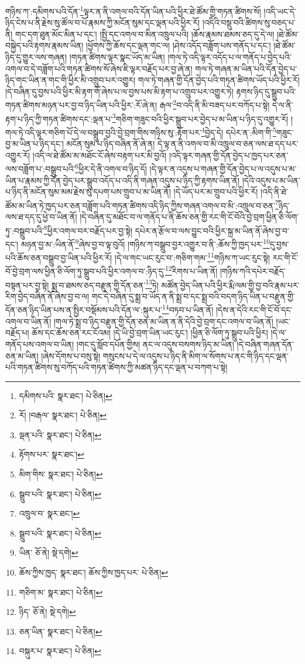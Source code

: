གཉིས་ཀ་:དམིགས་པའི་དོན་\footnote{དམིགས་པའི་  སྣར་ཐང་།  པེ་ཅིན། }ལྟར་ན་ནི་འགལ་བའི་དོན་ཡིན་པའི་ཕྱིར་ཐེ་ཚོམ་གྱི་གཏན་ཚིགས་སོ། །འདི་ཡང་དེ་ཉིད་ངེས་པ་ནི་རྗེས་སུ་ཚོལ་བ་པོ་རྣམས་ཀྱི་མངོན་སུམ་དང་ལྡན་པའི་ཕྱིར་རོ། །འདིའི་བསྡུ་བའི་ཚིགས་སུ་བཅད་པ་ནི། གང་དག་ཐུན་མོང་མིན་པ་དང་། །སྤྱི་དང་འགལ་བ་མིན་འཁྲུལ་པའི། །ཆོས་རྣམས་ཐམས་ཅད་དུ་དེ་ལ། །ཐེ་ཚོམ་བསྐྱེད་པའི་རྟགས་རྣམས་ཡིན། །ཕྱོགས་ཀྱི་ཆོས་དང་ལྡན་གང་ལ། །ཤེས་འདོད་བཟློག་པས་གནོད་པ་དང་། །ཐེ་ཚོམ་ཉིད་དུ་གྱུར་ལས་གཞན། །གཏན་ཚིགས་ལྟར་སྣང་ཡོད་མ་ཡིན། །གལ་ཏེ་འདི་ལྟར་འདོད་པ་ལ་གནོད་པ་བྱེད་པའི་འགལ་བ་དེ་བཟློག་པའི་གཏན་ཚིགས་སོ་ཞེས་ཇི་ལྟར་བརྗོད་པར་བྱ་ཞེ་ན། གལ་ཏེ་གཞན་མ་ཡིན་པའི་དོན་བྱེད་པ་ཉིད་གང་ཡིན་ན་གང་གི་ཕྱིར་མི་འགྲུབ་པར་འགྱུར། གལ་ཏེ་གཞན་གྱི་དོན་བྱེད་པའི་གཏན་ཚིགས་ཡོད་པའི་ཕྱིར་རོ། །དེ་བཞིན་དུ་བྱས་པའི་ཕྱིར་མི་རྟག་གོ་ཞེས་པ་ལ་བྱས་པས་མི་རྟག་པ་འགྲུབ་པར་འགྱུར་ཏེ། རྟགས་ཉིད་དུ་སྒྲུབ་པའི་གཏན་ཚིགས་མཉན་པར་བྱ་བ་ཉིད་ཡིན་པའི་ཕྱིར་:རོ་ཞེ་ན། རྒལ་\footnote{རོ། །བརྒལ་  སྣར་ཐང་།  པེ་ཅིན། }བ་འདི་ནི་མི་བཟད་པར་བཀོད་པ་སྟེ། དེ་ལ་ནི་རྟག་པ་ཉིད་ཀྱི་གཏན་ཚིགས་དང་:ལྡན་པ་\footnote{ལྡན་པའི་  སྣར་ཐང་།  པེ་ཅིན། }གཅིག་གཟུང་བའི་ཕྱིར་སྒྲུབ་པར་བྱེད་པ་མ་ཡིན་པ་ཉིད་དུ་འགྱུར་རོ། །གལ་ཏེ་འདི་ལྟར་གཅིག་པོ་དེ་ལ་བསྒྲུབ་བྱའི་བྱེ་བྲག་གིས་གཉིས་སུ་:རྟོག་པར་\footnote{རྟོགས་པར་  སྣར་ཐང་། }བྱེད་དེ། དཔེར་ན་:མིག་གི་\footnote{མིག་གིས་  སྣར་ཐང་།  པེ་ཅིན། }གཟུང་བྱ་མ་ཡིན་པ་ཉིད་དང་། མངོན་སུམ་པ་ཉིད་བཞིན་ནོ་ཞེ་ན། དེ་ལྟ་ན་ནི་འགལ་བ་མི་འཁྲུལ་བ་ཅན་ལས་ཐ་དད་པར་འགྱུར་རོ། །འདི་ལ་ཐེ་ཚོམ་མ་མཐོང་ངོ་ཞེས་བརྟག་པར་མི་བྱའོ། །འདི་ལྟར་གཞན་གྱི་དོན་བྱེད་པ་ཁྱད་པར་ཅན་ལས་བཟློག་པ་:བསྒྲུབ་པའི་\footnote{སྒྲུབ་པའི་  སྣར་ཐང་།  པེ་ཅིན། }ཕྱིར་དེ་ནི་འགལ་བ་ཉིད་དོ། །དེ་ལྟར་ན་འདུས་པ་གཞན་གྱི་དོན་བྱེད་པ་ལ་འདུས་པ་མ་ཡིན་པ་རྣམས་ཀྱི་དོན་བྱེད་པར་སྒྲུབ་འདོད་པ་འདི་ནི་གཞན་འདུས་པ་ཉིད་ཀྱི་རྟགས་ཡིན་ནོ། །དེའི་འདུས་པ་མ་ཡིན་པ་ཉིད་ནི་མངོན་སུམ་མམ་རྗེས་སུ་དཔག་པས་གྲུབ་པ་མ་ཡིན་ནོ། །དེ་ཡོད་པར་མ་གྲུབ་པའི་ཕྱིར་རོ། །འདི་ནི་ཐེ་ཚོམ་མ་ཡིན་ཏེ་ཁྱད་པར་ཅན་བཟློག་པའི་གཏན་ཚིགས་འདི་ཉིད་ཀྱིས་གཞན་འགལ་བ་མི་:འཁྲུལ་བ་ཅན་\footnote{འཁྲུལ་བ་  སྣར་ཐང་། }ཉིད་ལས་ཐ་དད་དུ་ཕྱེ་བ་ཡིན་ནོ། །དེ་བཞིན་དུ་མཐོང་བ་ལ་གནོད་པ་ནི་ཆོས་ཅན་གྱི་རང་གི་ངོ་བོའི་བྱེ་བྲག་ཕྱིན་ཅི་ལོག་ཏུ་:བསྒྲུབ་པའི་\footnote{སྒྲུབ་པའི་  སྣར་ཐང་།  པེ་ཅིན། }ཕྱིར་འགལ་བར་བརྗོད་པར་བྱ་སྟེ། དཔེར་ན་རྩོལ་བ་ལས་བྱུང་བའི་ཕྱིར་སྐྲ་མ་ཡིན་ནོ་ཞེས་བྱ་བ་དང་། མཉན་བྱ་མ་:ཡིན་ནོ་\footnote{ཡིན་  ཅོ་ནེ།  སྡེ་དགེ། }ཞེས་བྱ་བ་ལྟ་བུའོ། །གཉིས་ཀ་བསྒྲུབ་བྱར་འགྱུར་བ་ནི་:ཆོས་ཀྱི་ཁྱད་པར་\footnote{ཆོས་ཀྱིས་ཁྱད་  སྣར་ཐང་། ཆོས་ཀྱིས་ཁྱད་པར་  པེ་ཅིན། }དུ་བྱས་པའི་ཆོས་ཅན་བསྒྲུབ་བྱ་ཡིན་པའི་ཕྱིར་རོ། །དེ་ལ་གང་ཡང་རུང་བ་:གཅིག་གམ་\footnote{གཅིག་མ་  སྣར་ཐང་།  པེ་ཅིན། }གཉིས་ཀ་ཡང་རུང་སྟེ། རང་གི་ངོ་བོ་བྱེ་བྲག་ལས་ཕྱིན་ཅི་ལོག་ཏུ་སྒྲུབ་པའི་ཕྱིར་འགལ་བ་:ཉིད་དུ་\footnote{ཉིད་  ཅོ་ནེ།  སྡེ་དགེ། }རིགས་པ་ཡིན་ནོ། །གཉིས་ཀའི་དཔེར་བརྗོད་བསྟན་པར་བྱ་སྟེ། སྨྲ་བ་ཐམས་ཅད་བརྫུན་གྱི་དོན་ཅན་\footnote{ཅན་ཡིན་  སྣར་ཐང་།  པེ་ཅིན། }ཏེ། མཚོན་བྱེད་ཡིན་པའི་ཕྱིར་རྨི་ལམ་གྱི་བྱ་བའི་རྣམ་པར་རིག་བྱེད་བཞིན་ནོ་ཞེས་བྱ་བ་ལ། གང་དེ་བཞིན་དུ་སྨྲ་བ་ཡོད་ན་ནི་སྨྲ་བ་དང་སྨྲ་བའི་བདག་ཉིད་ཡིན་པ་བརྫུན་གྱི་དོན་ཅན་ཉིད་ཡིན་པས་ན་སྤྱིར་བསྡོམས་པའི་དོན་ལ་:སྐུར་པ་\footnote{བསྐུར་པ་  སྣར་ཐང་།  པེ་ཅིན། }བཏབ་པ་ཡིན་ནོ། །དེས་ན་དེའི་རང་གི་ངོ་བོ་དང་འགལ་བ་ཡིན་ནོ། །གལ་ཏེ་སྨྲ་བ་ཉིད་བརྫུན་གྱི་དོན་ཅན་མ་ཡིན་ན་ནི་དེའི་བྱེ་བྲག་དང་འགལ་བ་ཡིན་ནོ། །ཡང་བརྗོད་པ། ཆོས་དང་ཆོས་ཅན་རང་ངོའམ། །དེ་ཡི་བྱེ་བྲག་ཡིན་ཡང་རུང་། །ཕྱིན་ཅི་ལོག་ཏུ་སྒྲུབ་པའི་ཕྱིར། །དེ་ལ་གནོད་པས་འགལ་བ་ཡིན། །གང་དུ་སློབ་དཔོན་གྱིས། ནང་ལ་འདུས་བསགས་ཉིད་མ་ཡིན། །དེ་བཞིན་གཞན་དོན་ཅན་མ་ཡིན། །ཞེས་དོགས་པ་བསུ་སྟེ། གསུངས་པ་དེ་ལ་འདུས་པ་ཉིད་ནི་མིག་ལ་སོགས་པ་ནང་གི་ཉིད་དང་ལྡན་པའི་གཏན་ཚིགས་སུ་བཀོད་པའི་གཏན་ཚིགས་ཀྱི་མཚན་ཉིད་དང་ལྡན་པ་བཀག་པ་སྟེ། 
